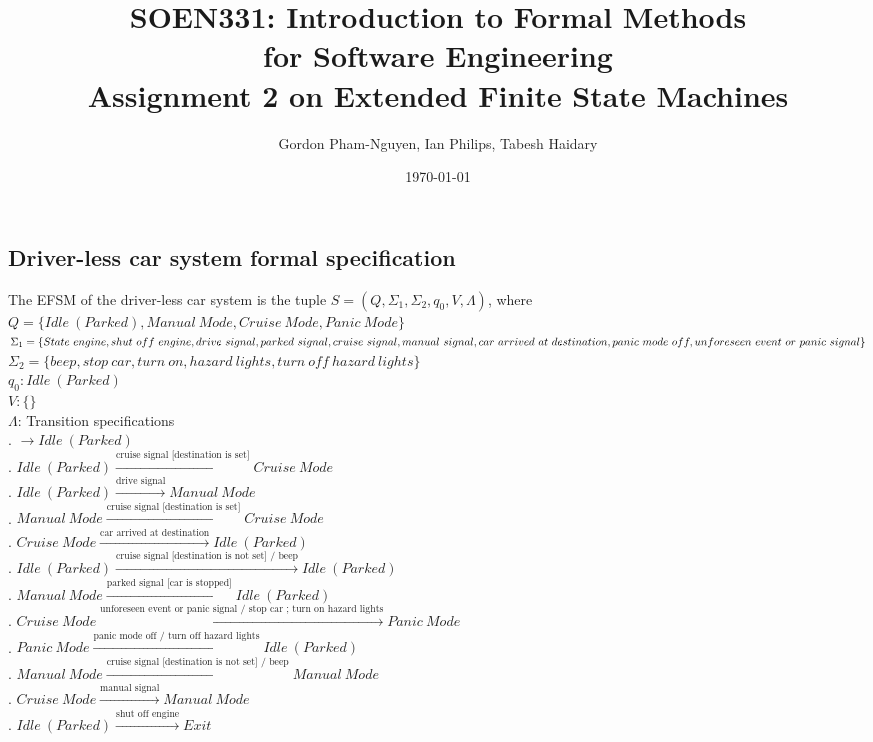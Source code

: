 \documentclass[12pt]{article}
\title{SOEN331: Introduction to Formal Methods\\for Software Engineering\\
Assignment 2 on Extended Finite State Machines}
\author{Gordon Pham-Nguyen, Ian Philips, Tabesh Haidary}
\date{\today}
\begin{document}
\begin{spacing}{1.5}

\maketitle

\newpage

\section{Driver-less car system formal specification}

\noindent The EFSM of the driver-less car system is the tuple $S = (Q, \Sigma_1, \Sigma_2, q_0, V, \Lambda)$, where\\

\noindent $Q = \{Idle~(Parked), Manual~Mode, Cruise~Mode, Panic~Mode\}$\\
\noindent $\Sigma_1 = \{State~engine, shut~off~engine, drive~signal, parked~signal, cruise~signal, manual~signal,\\ car~arrived~at~destination, panic~mode~off, unforeseen~event~or~panic~signal\}$\\
\noindent $\Sigma_2 = \{beep, stop~car, turn~on, hazard~lights, turn~off~hazard~lights\}$\\
\noindent $q_0: Idle~(Parked)$\\
\noindent $V: \{\}$\\
\noindent $\Lambda$: Transition specifications\\
. $\rightarrow Idle~(Parked)$\\
. $Idle~(Parked) \xrightarrow {\text {cruise~signal [destination is set]}} Cruise~Mode$\\
. $Idle~(Parked) \xrightarrow {\text {drive~signal}} Manual~Mode$\\
. $Manual~Mode \xrightarrow {\text {cruise~signal [destination is set]}} Cruise~Mode$\\
. $Cruise~Mode \xrightarrow {\text {car~arrived~at~destination}} Idle~(Parked)$\\
. $Idle~(Parked) \xrightarrow {\text {cruise~signal [destination is not set] / beep}} Idle~(Parked)$\\
. $Manual~Mode \xrightarrow {\text {parked~signal [car is stopped]}} Idle~(Parked)$\\
. $Cruise~Mode \xrightarrow {\text {unforeseen~event~or~panic~signal / stop car ; turn on hazard lights}} Panic~Mode$\\
. $Panic~Mode \xrightarrow {\text {panic~mode~off / turn off hazard lights}} Idle~(Parked)$\\
. $Manual~Mode \xrightarrow {\text {cruise signal [destination is not set] / beep}} Manual~Mode$\\
. $Cruise~Mode \xrightarrow {\text {manual signal}} Manual~Mode$\\
. $Idle~(Parked) \xrightarrow {\text {shut off engine}} Exit$\\


\end{spacing}
\end{document}
